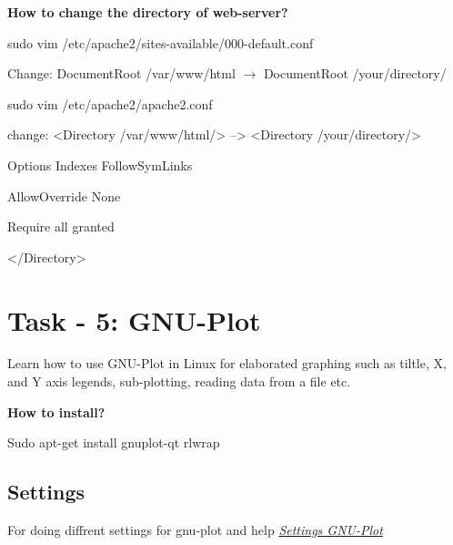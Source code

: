 \documentclass[letterpaper,10pt,english]{sphinxmanual}
\begin{document}
\textbf{How to change the directory of web-server?}

sudo vim /etc/apache2/sites-available/000-default.conf

Change: DocumentRoot /var/www/html \(\rightarrow\) DocumentRoot /your/directory/

sudo vim /etc/apache2/apache2.conf

change: \textless{}Directory /var/www/html/\textgreater{}  –\textgreater{} \textless{}Directory /your/directory/\textgreater{}

Options Indexes FollowSymLinks

AllowOverride None

Require all granted

\textless{}/Directory\textgreater{}


\section{Task - 5: GNU-Plot}
\label{week-07:task-5-gnu-plot}
Learn how to use GNU-Plot in Linux for elaborated graphing such as tiltle, X, and Y axis legends, sub-plotting, reading data from a file etc.

\textbf{How to install?}

Sudo apt-get install gnuplot-qt rlwrap


\subsection{Settings}
\label{week-07:settings}
For doing diffrent settings for gnu-plot and help {\hyperref[appendix:gnu\string-plot]{\emph{Settings GNU-Plot}}}
\end{document}
